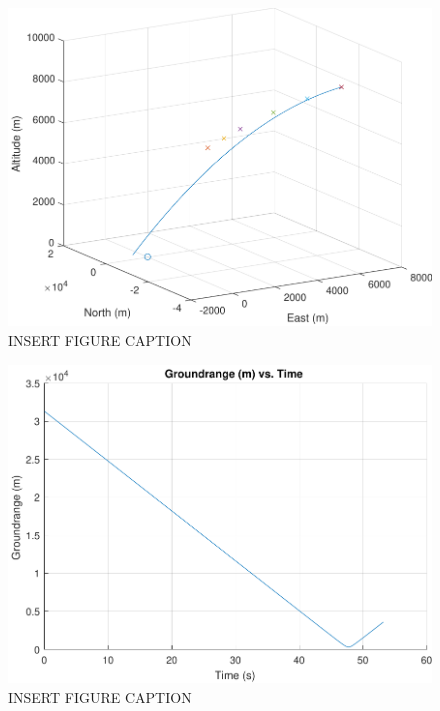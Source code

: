 \begin{figure}[H]
	\centering
	\begin{minipage}{4.5 in}
		\includegraphics[width=\linewidth]{Figures/trajunpowvac_1.pdf}
		\caption{INSERT FIGURE CAPTION \label{fig:trajunpowvac_1} }
	\end{minipage}
\end{figure}



\begin{figure}[H]
	\centering
	\begin{minipage}{4.5 in}
		\includegraphics[width=\linewidth]{Figures/trajunpowvacgr.pdf}
		\caption{INSERT FIGURE CAPTION \label{fig:trajunpowvacgr} }
	\end{minipage}
\end{figure}





